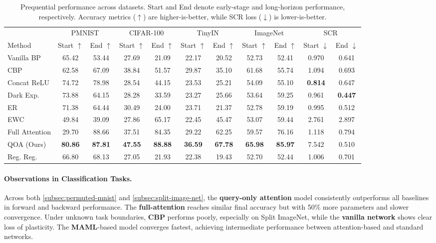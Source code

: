 \documentclass{article}
\begin{document}
\begin{table}[t]
\centering
\small
\begin{tabular}{lcccccccccc}
\toprule
& \multicolumn{2}{c}{PMNIST} & \multicolumn{2}{c}{CIFAR-100} & \multicolumn{2}{c}{TinyIN} & \multicolumn{2}{c}{ImageNet} & \multicolumn{2}{c}{SCR} \\
Method 
& Start $\uparrow$ & End $\uparrow$ 
& Start $\uparrow$ & End $\uparrow$ 
& Start $\uparrow$ & End $\uparrow$ 
& Start $\uparrow$ & End $\uparrow$ 
& Start $\downarrow$ & End $\downarrow$ \\
\midrule
Vanilla BP      & 65.42 & 53.44 & 27.69 & 21.09 & 22.17 & 20.52 & 52.73 & 52.41 & 0.970 & 0.641 \\
CBP             & 62.58 & 67.09 & 38.84 & 51.57 & 29.87 & 35.10 & 61.68 & 55.74 & 1.094 & 0.693 \\
Concat ReLU     & 74.72 & 78.98 & 28.54 & 44.15 & 23.53 & 25.21 & 54.09 & 55.10 & \textbf{0.814} & 0.647 \\
Dark Exp.       & 73.88 & 64.15 & 28.28 & 33.59 & 23.27 & 25.66 & 53.64 & 59.25 & 0.961 & \textbf{0.447} \\
ER              & 71.38 & 64.44 & 30.49 & 24.00 & 23.71 & 21.37 & 52.78 & 59.19 & 0.995 & 0.512 \\
EWC             & 49.84 & 39.09 & 27.86 & 65.17 & 22.45 & 45.47 & 53.07 & 59.44 & 2.761 & 2.897 \\
Full Attention  & 29.70 & 88.66 & 37.51 & 84.35 & 29.22 & 62.25 & 59.57 & 76.16 & 1.118 & 0.794 \\
QOA (Ours)      & \textbf{80.86} & \textbf{87.81} 
                & \textbf{47.55} & \textbf{88.88} 
                & \textbf{36.59} & \textbf{67.78} 
                & \textbf{65.98} & \textbf{85.97} 
                & 7.542 & 0.510 \\
Reg. Reg.       & 66.80 & 68.13 & 27.05 & 21.93 & 22.38 & 19.43 & 52.70 & 52.44 & 1.006 & 0.701 \\
\bottomrule
\end{tabular}
\caption{Prequential performance across datasets. Start and End denote early-stage and long-horizon performance, respectively. Accuracy metrics ($\uparrow$) are higher-is-better, while SCR loss ($\downarrow$) is lower-is-better.}
\label{tab:main_results}
\end{table}

\paragraph{Observations in Classification Tasks.}
Across both \ref{subsec:permuted-mnist} and \ref{subsec:split-image-net}, the \textbf{query-only attention} model consistently outperforms all baselines in forward and backward performance. 
The \textbf{full-attention} reaches similar final accuracy but with 50\% more parameters and slower convergence. 
Under unknown task boundaries, \textbf{CBP} performs poorly, especially on Split ImageNet, while the \textbf{vanilla network} shows clear loss of plasticity. 
The \textbf{MAML}-based model converges fastest, achieving intermediate performance between attention-based and standard networks.
\end{document}
